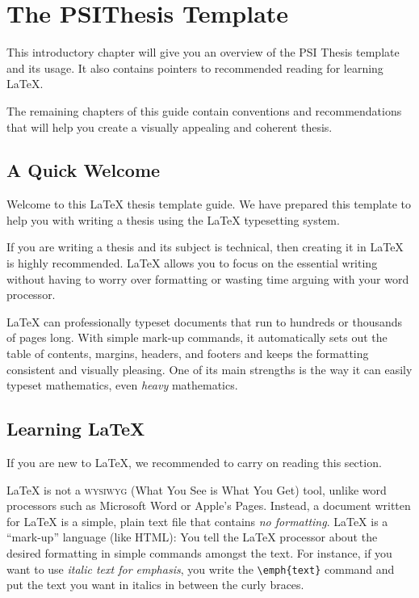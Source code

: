 \chapter{The PSIThesis Template} %

\label{Chapter1} %


This introductory chapter will give you an overview of the PSI Thesis template and its usage.
It also contains pointers to recommended reading for learning \LaTeX{}.

The remaining chapters of this guide contain conventions and recommendations that will help you create a visually appealing and coherent thesis.

\section{A Quick Welcome}

Welcome to this LaTeX thesis template guide.%
We have prepared this template to help you with writing a thesis using the LaTeX typesetting system.

If you are writing a thesis and its subject is technical, then creating it in LaTeX is highly recommended. LaTeX allows you to focus on the essential writing without having to worry over formatting or wasting time arguing with your word processor.

LaTeX can professionally typeset documents that run to hundreds or thousands of pages long. With simple mark-up commands, it automatically sets out the table of contents, margins, headers, and footers and keeps the formatting consistent and visually pleasing. One of its main strengths is the way it can easily typeset mathematics, even \emph{heavy} mathematics.


\section{Learning LaTeX}

If you are new to LaTeX, we recommended to carry on reading this section.

LaTeX is not a \textsc{wysiwyg} (What You See is What You Get) tool, unlike word processors such as Microsoft Word or Apple's Pages. Instead, a document written for LaTeX is a simple, plain text file that contains \emph{no formatting}. LaTeX is a \enquote{mark-up} language (like HTML): You tell the LaTeX processor about the desired formatting in simple commands amongst the text. For instance, if you want to use \emph{italic text for emphasis}, you write the \verb|\emph{text}| command and put the text you want in italics in between the curly braces.

